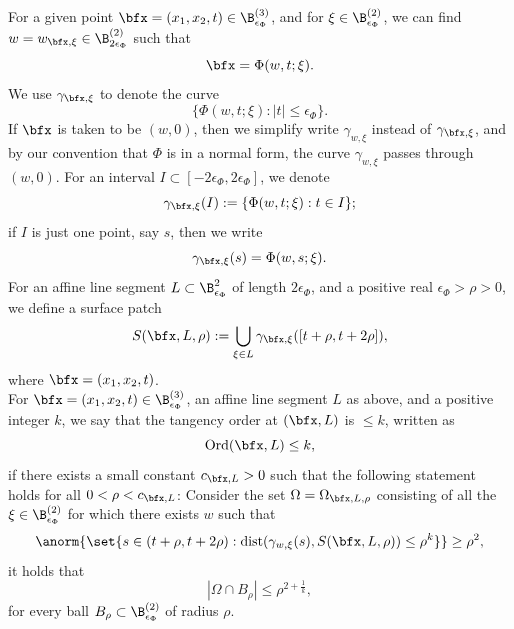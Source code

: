 \documentclass{article}
\numberwithin{equation}{section}
\theoremstyle{plain}
\begin{document}
For a given point $\bfx=(x_1, x_2, t)\in \B^{(3)}_{\epsilon_{\Phi}}$, and for $\xi\in \B^{(2)}_{\epsilon_{\Phi}}$, we can find $w=w_{\bfx, \xi}\in \B^{(2)}_{2\epsilon_{\Phi}}$ such that 
\begin{equation}
\bfx= \Phi(w, t; \xi).
\end{equation}
We use $\gamma_{\bfx, \xi}$ to denote the curve 
\begin{equation}
\{\Phi(
w, t; \xi
):
|t|\le \epsilon_{\Phi}
\}.
\end{equation}
If $\bfx$ is taken to be $(w, 0)$, then we simplify write $\gamma_{w, \xi}$ instead of $\gamma_{\bfx, \xi}$, and by our convention that $\Phi$ is in a normal form, the curve $\gamma_{w, \xi}$ passes through $(w, 0)$. 
For an interval $I\subset [-2\epsilon_{\Phi}, 2\epsilon_{\Phi}]$, we denote 
\begin{equation}
\gamma_{\bfx, \xi}(I):=
\{\Phi(
w, t; \xi
):
t\in I
\};
\end{equation}
if $I$ is just one point, say $s$, then we write 
\begin{equation}
\gamma_{\bfx, \xi}(s)= \Phi(w, s; \xi).
\end{equation}
For an affine line segment $L\subset \B^2_{\epsilon_{\Phi}}$ of length $2\epsilon_{\Phi}$, and a positive real $\epsilon_{\Phi}>\rho>0$, 
we define a surface patch 
\begin{equation}
S(\bfx, L, \rho):= 
\bigcup_{
\xi\in L
}
\gamma_{\bfx, \xi}([t+ \rho, t+2\rho]),
\end{equation}
where $\bfx=(x_1, x_2, t)$. \\

For $\bfx=(x_1, x_2, t)\in \B^{(3)}_{\epsilon_{\Phi}}$, an affine line segment $L$ as above, and a positive integer $k$,  we say that the tangency order at $(\bfx, L)$ is $\le k$, written as 
\begin{equation}
\mathrm{Ord}(\bfx, L)\le k,
\end{equation}
if there exists a small constant $c_{\bfx, L}>0$ such that  the following statement holds for all $0< \rho< c_{\bfx, L}$: Consider the set $\Omega=\Omega_{\bfx, L, \rho}$ consisting of all the $\xi\in \B^{(2)}_{\epsilon_{\Phi}}$ for which there exists $w$ such that 
\begin{equation}\label{260621e10_17}
\anorm{
\set{
s\in (t+\rho, t+ 2\rho):
\mathrm{dist}(
\gamma_{w, \xi}(s), S(\bfx, L, \rho)
)\le \rho^k
}
}\ge \rho^2,
\end{equation}
it holds that 
\begin{equation}\label{260621e10_18}
|\Omega\cap B_{\rho}|\le \rho^{2+\frac{1}{k}},
\end{equation}
for every ball $B_{\rho}\subset \B^{(2)}_{\epsilon_{\Phi}}$ of radius $\rho$. \\
\end{document}
